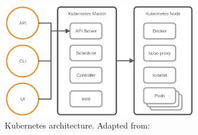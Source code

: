\begin{figure}[H]
    \centering
    \includegraphics[width=0.75\textwidth]{resources/images/kubernetes_architecture.png}
    \caption[Kubernetes architecture]{Kubernetes architecture. Adapted from: \cite{MSV:2016}}
    \label{fig:kubernetes_architecture}
\end{figure}

